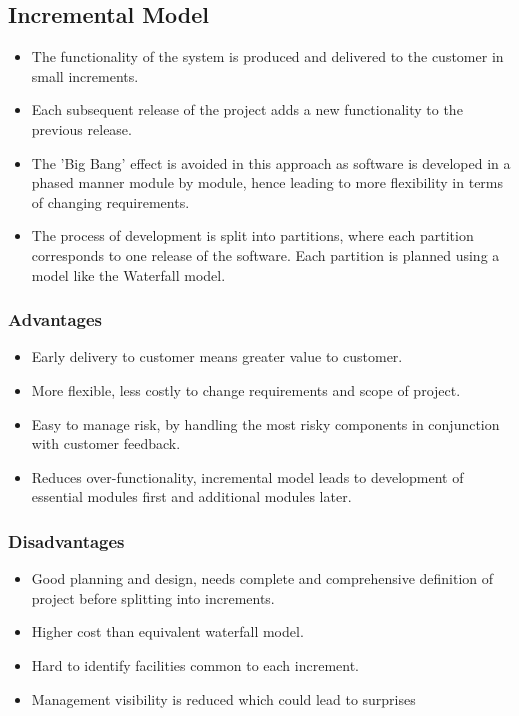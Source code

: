 \documentclass{article}
\begin{document}
\subsection{Incremental Model}
\begin{itemize}
    \item The functionality of the system is produced and delivered to the customer in small increments. 
    
    \item Each subsequent release of the project adds a new functionality to the previous release. 
    \item The 'Big Bang' effect is avoided in this approach as software is developed in a phased manner module by module, hence leading to more flexibility in terms of changing requirements.
    
    \item The process of development is split into partitions, where each partition corresponds to one release of the software. Each partition is planned using a model like the Waterfall model.
\end{itemize}

\subsubsection{Advantages}
\begin{itemize}
    \item Early delivery to customer means greater value to customer. 
    
    \item More flexible, less costly to change requirements and scope of project. 
    
    \item Easy to manage risk, by handling the most risky components in conjunction with customer feedback. 
    
    \item Reduces over-functionality, incremental model leads to development of essential modules first and additional modules later.
\end{itemize}

\subsubsection{Disadvantages}
\begin{itemize}
    \item Good planning and design, needs complete and comprehensive definition of project before splitting into increments. 
    
    \item Higher cost than equivalent waterfall model. 
    
    \item Hard to identify facilities common to each increment. 
    
    \item Management visibility is reduced which could lead to surprises
\end{itemize}
\end{document}
